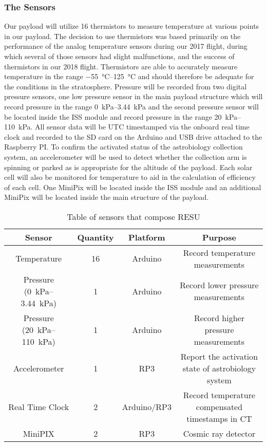 \subsubsection{The Sensors}

Our payload will utilize 16 thermistors to measure temperature at various points in our payload. The decision to use thermistors was based primarily on the performance of the analog temperature sensors during our 2017 flight, during which several of those sensors had slight malfunctions, and the success of thermistors in our 2018 flight. Thermistors are able to accurately measure temperature in the range \SIrange{-55}{125}{\celsius} and should therefore be adequate for the conditions in the stratosphere. Pressure will be recorded from two digital pressure sensors, one low pressure sensor in the main payload structure which will record pressure in the range \SIrange{0}{3.44}{\kilo\pascal} and the second pressure sensor will be located inside the ISS module and record pressure in the range \SIrange{20}{110}{\kilo\pascal}. All sensor data will be UTC timestamped via the onboard real time clock and recorded to the SD card on the Arduino and USB drive attached to the Raspberry PI. To confirm the activated status of the astrobiology collection system, an accelerometer will be used to detect whether the collection arm is spinning or parked as is appropriate for the altitude of the payload. Each solar cell will also be monitored for temperature to aid in the calculation of efficiency of each cell. One MiniPix will be located inside the ISS module and an additional MiniPix will be located inside the main structure of the payload.

\begin{table}[h!]
\centering
\caption{Table of sensors that compose RESU}
\label{tab:Sensors}
\bigskip
\begin{tabular}{|c|c|c|c|}
\hline
\multicolumn{1}{|c|}{\bfseries Sensor} & {\bfseries Quantity} & {\bfseries Platform} & {\bfseries Purpose} \\
\hline
    Temperature          		& 16 & Arduino  		& Record temperature measurements  \\ \hline
    Pressure (\SIrange{0}{3.44}{\kilo\pascal})        				& 1 & Arduino 		& Record lower pressure measurements \\ \hline
    Pressure (\SIrange{20}{110}{\kilo\pascal})        				& 1 & Arduino 		& Record higher pressure measurements \\ \hline
    Accelerometer       		& 1 & RP3    		& Report the activation state of astrobiology system \\ \hline
    Real Time Clock 				& 2 & Arduino/RP3 	& Record temperature compensated timestamps in CT \\\hline
    MiniPIX         				& 2 & RP3     		& Cosmic ray detector \\ \hline
\end{tabular}
\end{table}


